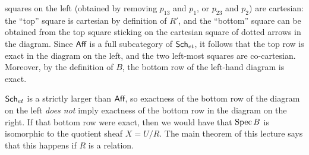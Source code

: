  squares on the left (obtained by removing $p_{13}$ and $p_1$, or $p_{23}$ and $p_2$) are
 cartesian: the ``top'' square is cartesian by definition of $R'$, and the ``bottom''
 square can be obtained from the top square sticking on the cartesian square of dotted
 arrows in the diagram. Since $\text{\sf Aff}$ is a full subcategory of $\text{\sf Sch}_{et}$, it follows
 that the top row is exact in the diagram on the left, and the two left-most squares are
 co-cartesian. Moreover, by the definition of $B$, the bottom row of the left-hand
 diagram is exact.
 \begin{warning}
   $\text{\sf Sch}_{et}$ is a strictly larger than $\text{\sf Aff}$, so exactness of the bottom row of the
   diagram on the left \emph{does not} imply exactness of the bottom row in the diagram
   on the right. If that bottom row were exact, then we would have that $\operatorname{Spec} B$ is
   isomorphic to the quotient sheaf $X=U/R$. The main theorem of this lecture says that
   this happens if $R$ is a relation.
 \end{warning}


